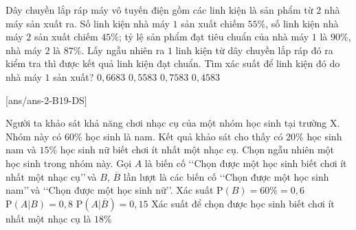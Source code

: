 \begin{ex}%
	Dây chuyền lắp ráp máy vô tuyến điện gồm các linh kiện là sản phẩm từ $2$ nhà máy sản xuất ra. Số linh kiện nhà máy $1$ sản xuất chiếm $55\%$, số linh kiện nhà máy $2$ sản xuất chiếm $45\%$; tỷ lệ sản phẩm đạt tiêu chuẩn của nhà máy $1$ là $90\%$, nhà máy $2$ là $87\%$. Lấy ngẫu nhiên ra $1$ linh kiện từ dây chuyền lắp ráp đó ra kiểm tra thì được kết quả linh kiện đạt chuẩn. Tìm xác suất để linh kiện đó do nhà máy $1$ sản xuất?
	\choice
	{$0{,}6683$}
	{\True$0{,}5583$}
	{$0{,}7583$}
	{$0{,}4583$}
\end{ex}

\cauds%
[ans/ans-2-B19-DS]

\begin{ex}%
	Người ta khảo sát khả năng chơi nhạc cụ của một nhóm học sinh tại trường X. Nhóm này có $60\%$ học sinh là nam. Kết quả khảo sát cho thấy có $20\%$ học sinh nam và $15\%$ học sinh nữ biết chơi ít nhất một nhạc cụ. Chọn ngẫu nhiên một học sinh trong nhóm này. Gọi $A$ là biến cố \lq\lq Chọn được một học sinh biết chơi ít nhất một nhạc cụ\rq\rq\,và $B$, $\overline{B}$ lần lượt là các biến cố \lq\lq Chọn được một học sinh nam\rq\rq\,và \lq\lq Chọn được một học sinh nữ\rq\rq. 
	\choiceTF
	{\True Xác suất $\mathrm{P}(B) = 60\% = 0{,}6$}
	{$\mathrm{P}(A|B) = 0{,}8$}
	{\True $\mathrm{P}(A|\overline{B}) = 0{,}15$}
	{\True Xác suất để chọn được học sinh biết chơi ít nhất một nhạc cụ là $18\%$}
\end{ex}

